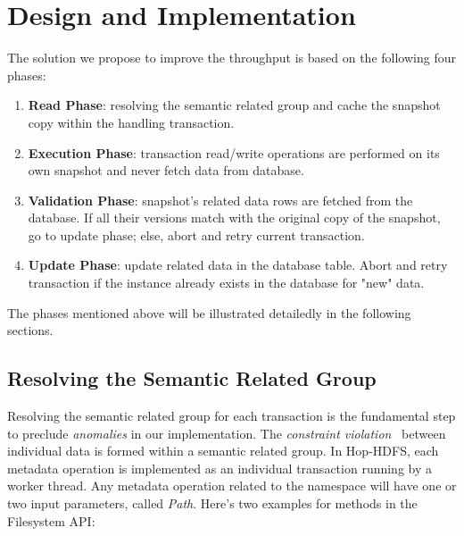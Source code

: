 
%
%


\chapter{Design and Implementation}
The solution we propose to improve the throughput is based on the following four phases:
\begin{enumerate}[noitemsep]
	\item \textbf{Read Phase}: resolving the semantic related group and cache the snapshot copy within the handling transaction.
	\item \textbf{Execution Phase}: transaction read/write operations are performed on its own snapshot and never fetch data from database.
	\item \textbf{Validation Phase}: snapshot's related data rows are fetched from the database. If all their versions match with the original copy of the snapshot, go to update phase; else, abort and retry current transaction.
	\item \textbf{Update Phase}: update related data in the database table. Abort and retry transaction if the instance already exists in the database for "new" data.
\end{enumerate}
\label{ch:Design}

\noindent The phases mentioned above will be illustrated detailedly in the following sections.
\section{Resolving the Semantic Related Group}

Resolving the semantic related group for each transaction is the fundamental step to preclude \textit{anomalies} in our implementation. The \textit{constraint violation}~\cite{berenson1995critique} between individual data is formed within a semantic related group. In Hop-HDFS, each metadata operation is implemented as an individual transaction running by a worker thread. Any metadata operation related to the namespace will have one or two input parameters, called \textit{Path}. Here's two examples for methods in the Filesystem API:

